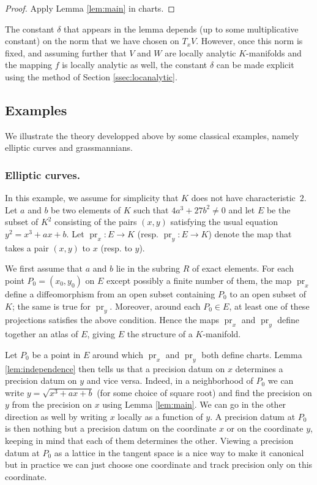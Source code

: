 \documentclass{lms}
\DeclareMathOperator{\pr}{pr}
\begin{document}
\begin{proof}
Apply Lemma \ref{lem:main} in charts.
\end{proof}

\begin{rmk}
The constant $\delta$ that appears in the lemma depends (up to
some multiplicative constant) on the norm that we have chosen on $T_x V$. 
However, once this norm is fixed, and assuming further that $V$ and $W$ 
are locally analytic $K$-manifolds and the mapping $f$ is locally 
analytic as well, the constant $\delta$ can be made explicit using the 
method of Section \ref{ssec:locanalytic}.
\end{rmk}

\subsection{Examples}
\label{ssec:exmanifold}

We illustrate the theory developped above by some classical examples,
namely elliptic curves and grassmannians.

\subsubsection*{Elliptic curves.}

In this example, we assume for simplicity that $K$ does not have characteristic~$2$.
Let $a$ and $b$ be two elements of $K$ such that $4 a^3 + 27 b^2 
\neq 0$ and let $E$ be the subset of $K^2$ consisting of the pairs 
$(x,y)$ satisfying the usual equation $y^2 = x^3 + a x + b$.
Let $\pr_x : E \to K$ (resp. $\pr_y : E \to K$) denote the map that 
takes a pair $(x,y)$ to $x$ (resp. to $y$).

We first assume that $a$ and $b$ lie in the subring $R$ of exact elements. For each point $P_0 = 
(x_0, y_0)$ on $E$ except possibly a finite number of them, the map 
$\pr_x$ define a diffeomorphism from an open subset containing $P_0$ to 
an open subset of $K$; the same is true for $\pr_y$. Moreover, around each 
$P_0 \in E$, at least one of these projections satisfies the above condition.
Hence the maps $\pr_x$ and $\pr_y$ define together an atlas of $E$, giving $E$ the structure of 
a $K$-manifold.

Let $P_0$ be a point in $E$ around which $\pr_x$ and $\pr_y$ both define 
charts. Lemma \ref{lem:independence} then tells us that a 
precision datum on $x$ determines a precision datum on $y$ and vice 
versa. Indeed, in a neighborhood of $P_0$ we can write $y = \sqrt{x^3 + a x + b}$ 
(for some choice of square root) and find the 
precision on $y$ from the precision on $x$ using Lemma \ref{lem:main}. We can go 
in the other direction as well by writing $x$ locally as a function of 
$y$. A precision datum at $P_0$ is then nothing but a precision datum
on the coordinate $x$ or on the coordinate $y$, keeping in mind that 
each of them determines the other. Viewing a precision datum at $P_0$ as 
a lattice in the tangent space is a nice way to make it canonical but in 
practice we can just choose one coordinate and track precision
only on this coordinate.
\end{document}
